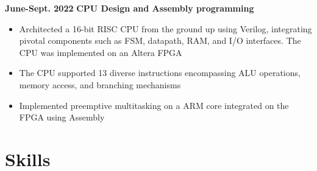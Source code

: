 \documentclass[11pt,a4paper,sans]{moderncv}
\begin{document}
\cventry
{\textnormal{\textbf{June-Sept. 2022}}}
{\textnormal{\textbf{CPU Design and Assembly programming}}}
{}{}{}
{
    \begin{itemize}
    \item Architected a 16-bit RISC CPU from the ground up using Verilog, integrating pivotal components such as FSM, datapath, RAM, and I/O interfaces. The CPU was implemented on an Altera FPGA
    \item The CPU supported 13 diverse instructions encompassing ALU operations, memory access, and branching mechanisms
    \item Implemented preemptive multitasking on a ARM core integrated on the FPGA using Assembly
\end{itemize}
}

\section{Skills}

\end{document}
